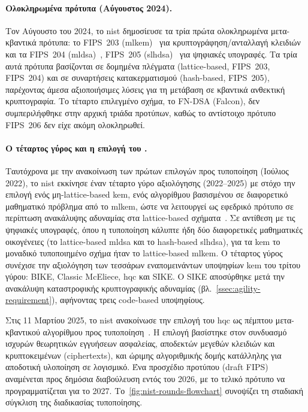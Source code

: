 \paragraph{Ολοκληρωμένα πρότυπα (Αύγουστος 2024).}
Τον Αύγουστο του 2024, το \gls{nist} δημοσίευσε τα τρία πρώτα ολοκληρωμένα
μετα-κβαντικά πρότυπα: το FIPS~203 (\gls{mlkem})~\cite{FIPS203} για
κρυπτογράφηση/ανταλλαγή κλειδιών και τα FIPS~204
(\gls{mldsa})~\cite{FIPS204}, FIPS~205
(\gls{slhdsa})~\cite{FIPS205} για ψηφιακές υπογραφές. Τα τρία αυτά πρότυπα
βασίζονται σε δομημένα πλέγματα (lattice-based, FIPS~203, FIPS~204) και σε συναρτήσεις κατακερματισμού (hash-based, FIPS~205), παρέχοντας άμεσα αξιοποιήσιμες λύσεις για τη μετάβαση
σε κβαντικά ανθεκτική κρυπτογραφία. Το τέταρτο επιλεγμένο σχήμα, το FN-DSA (Falcon), δεν συμπεριλήφθηκε στην αρχική τριάδα προτύπων, καθώς το αντίστοιχο πρότυπο FIPS~206 δεν είχε ακόμη ολοκληρωθεί.

\paragraph{Ο τέταρτος γύρος και η επιλογή του \HQC.}
Ταυτόχρονα με την ανακοίνωση των πρώτων επιλογών προς τυποποίηση (Ιούλιος 2022),
το \gls{nist} εκκίνησε έναν τέταρτο γύρο αξιολόγησης (2022–2025) με στόχο την επιλογή ενός μη-lattice-based
\gls{kem}, ενός αλγορίθμου βασισμένου σε διαφορετικό μαθηματικό πρόβλημα από το
\gls{mlkem}, ώστε να λειτουργεί ως εφεδρικό πρότυπο σε περίπτωση ανακάλυψης
αδυναμίας στα lattice-based σχήματα~\cite{NIST-IR8545}. Σε αντίθεση με τις ψηφιακές υπογραφές, όπου η τυποποίηση κάλυπτε ήδη δύο διαφορετικές μαθηματικές οικογένειες (το lattice-based \gls{mldsa} και το hash-based \gls{slhdsa}), για τα \gls{kem} το μοναδικό τυποποιημένο σχήμα ήταν το lattice-based \gls{mlkem}. Ο τέταρτος γύρος συνέχισε την
αξιολόγηση των τεσσάρων εναπομεινάντων υποψηφίων \gls{kem} του τρίτου γύρου:
BIKE, Classic McEliece, \gls{hqc} και SIKE. Ο
SIKE αποσύρθηκε μετά την ανακάλυψη καταστροφικής κρυπτογραφικής αδυναμίας 
(βλ.~\cref{ssec:agility-requirement}), αφήνοντας τρεις code-based υποψηφίους.

Στις 11 Μαρτίου 2025, το \gls{nist} ανακοίνωσε την επιλογή του \gls{hqc} ως
πέμπτου μετα-κβαντικού αλγορίθμου προς
τυποποίηση~\cite{NIST-HQC-selection2025}. Η επιλογή βασίστηκε στον συνδυασμό
ισχυρών θεωρητικών εγγυήσεων ασφαλείας, αποδεκτών μεγεθών κλειδιών και
κρυπτοκειμένων (ciphertexts), και ώριμης αλγοριθμικής δομής κατάλληλης για αποδοτική
υλοποίηση σε λογισμικό. Ένα προσχέδιο προτύπου (draft FIPS) αναμένεται προς
δημόσια διαβούλευση εντός του 2026, με το τελικό πρότυπο να προγραμματίζεται
για το 2027. Το~\cref{fig:nist-rounds-flowchart} συνοψίζει τη σταδιακή σύγκλιση
της διαδικασίας τυποποίησης.

